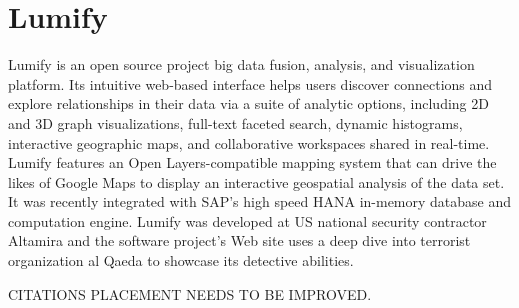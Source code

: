 \section{Lumify}
Lumify is an open source project big data fusion, analysis, and visualization
platform. Its intuitive web-based interface helps users discover connections
and explore relationships in their data via a suite of analytic options,
including 2D and 3D graph visualizations, full-text faceted search, dynamic
histograms, interactive geographic maps, and collaborative workspaces shared in
real-time.\cite{lumify-web} Lumify features an Open Layers-compatible mapping
system that can drive the likes of Google Maps to display an interactive
geospatial analysis of the data set. It was recently integrated with SAP's
high speed HANA in-memory database and computation engine. Lumify was developed
at US national security contractor Altamira and the software project's Web
site uses a deep dive into terrorist organization al Qaeda to showcase its
detective abilities.\cite{lumify-linkedin}
 
CITATIONS PLACEMENT NEEDS TO BE IMPROVED.
